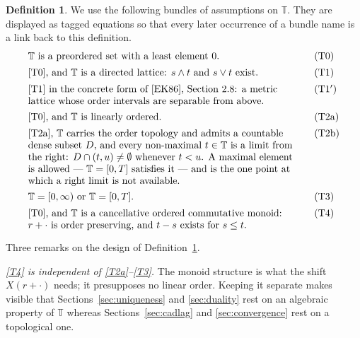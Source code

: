 \documentclass[11pt,a4paper]{article}
\theoremstyle{plain}
\theoremstyle{definition}
\newtheorem{definition}[theorem]{Definition}
\theoremstyle{remark}
\newcommand{\T}{\mathbb{T}}                     %
\newcommand{\EK}{\cite{EK86}}
\begin{document}
\begin{definition}
  \label{def:bundles}
  We use the following bundles of assumptions on $\T$.  They are displayed as
  tagged equations so that every later occurrence of a bundle name is a link back
  to this definition.
  \begin{align}
    &\parbox[t]{0.78\textwidth}{\raggedright
      $\T$ is a preordered set with a least element $0$.}
      \tag{T0}\label{T0} \\[0.4ex]
    &\parbox[t]{0.78\textwidth}{\raggedright
      \eqref{T0}, and $\T$ is a directed lattice: $s \wedge t$ and $s \vee t$
      exist.}
      \tag{T1}\label{T1} \\[0.4ex]
    &\parbox[t]{0.78\textwidth}{\raggedright
      \eqref{T1} in the concrete form of \EK, Section~2.8: a metric lattice whose
      order intervals are separable from above.}
      \tag{T1$'$}\label{T1p} \\[0.4ex]
    &\parbox[t]{0.78\textwidth}{\raggedright
      \eqref{T0}, and $\T$ is linearly ordered.}
      \tag{T2a}\label{T2a} \\[0.4ex]
    &\parbox[t]{0.78\textwidth}{\raggedright
      \eqref{T2a}, $\T$ carries the order topology and admits a countable dense
      subset $D$, and every non-maximal $t \in \T$ is a limit from the right:
      $D \cap (t,u) \neq \emptyset$ whenever $t < u$.  A maximal element is
      allowed --- $\T = [0,T]$ satisfies it --- and is the one point at which a
      right limit is not available.}
      \tag{T2b}\label{T2b} \\[0.4ex]
    &\parbox[t]{0.78\textwidth}{\raggedright
      $\T = [0,\infty)$ or $\T = [0,T]$.}
      \tag{T3}\label{T3} \\[0.4ex]
    &\parbox[t]{0.78\textwidth}{\raggedright
      \eqref{T0}, and $\T$ is a cancellative ordered commutative monoid:
      $r + \cdot$ is order preserving, and $t - s$ exists for $s \leq t$.}
      \tag{T4}\label{T4}
  \end{align}
\end{definition}

Three remarks on the design of Definition~\ref{def:bundles}.

\emph{\eqref{T4} is independent of \eqref{T2a}--\eqref{T3}.}  The monoid structure is what the
shift $X(r+\cdot)$ needs; it presupposes no linear order.  Keeping it separate
makes visible that Sections~\ref{sec:uniqueness} and \ref{sec:duality} rest on an
algebraic property of $\T$ whereas Sections~\ref{sec:cadlag} and
\ref{sec:convergence} rest on a topological one.
\end{document}
